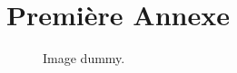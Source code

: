 \appendix%

\chapter{Première Annexe}

\begin{figure}[!h]
  \centering
  \caption{Image dummy.}
  \label{fig:g1}
\end{figure}
